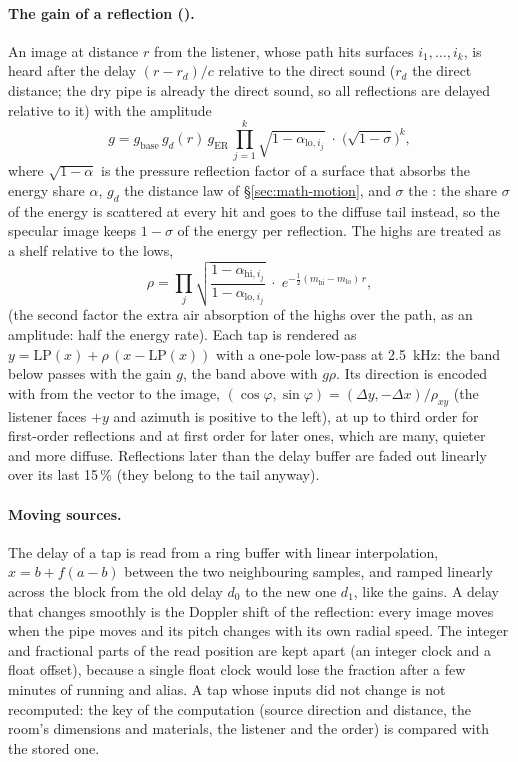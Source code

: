 \paragraph{The gain of a reflection ().} An image at distance $r$ from the listener, whose path hits
surfaces $i_1,\dots,i_k$, is heard after the delay $(r - r_d)/c$ relative to the direct sound ($r_d$ the direct distance;
the dry pipe is already the direct sound, so all reflections are delayed relative to it) with the amplitude
\begin{equation}
  g = g_\mathrm{base}\, g_d(r)\, g_\mathrm{ER}\,\prod_{j=1}^{k}\sqrt{1-\alpha_{\mathrm{lo},i_j}}\;\cdot\;\bigl(\sqrt{1-\sigma}\bigr)^{k},
\end{equation}
where $\sqrt{1-\alpha}$ is the pressure reflection factor of a surface that absorbs the energy share $\alpha$, $g_d$ the
distance law of \S\ref{sec:math-motion}, and $\sigma$ the : the share $\sigma$ of the energy is scattered at
every hit and goes to the diffuse tail instead, so the specular image keeps $1-\sigma$ of the energy per reflection. The
highs are treated as a shelf relative to the lows,
\begin{equation}
  \rho = \prod_j \sqrt{\frac{1-\alpha_{\mathrm{hi},i_j}}{1-\alpha_{\mathrm{lo},i_j}}}\;\cdot\;e^{-\frac12(m_\mathrm{hi}-m_\mathrm{lo})\,r},
\end{equation}
(the second factor the extra air absorption of the highs over the path, as an amplitude: half the energy rate). Each tap
is rendered as $y = \mathrm{LP}(x) + \rho\,(x - \mathrm{LP}(x))$ with a one-pole low-pass at \SI{2.5}{kHz}: the band
below passes with the gain $g$, the band above with $g\rho$. Its direction is encoded with  from the
vector to the image, $(\cos\varphi,\sin\varphi) = (\Delta y, -\Delta x)/\rho_{xy}$ (the listener faces $+y$ and
azimuth is positive to the left), at up to third order for first-order reflections and at first order for later ones,
which are many, quieter and more diffuse. Reflections later than the delay buffer are faded out linearly over its last
15\,\% (they belong to the tail anyway).

\paragraph{Moving sources.} The delay of a tap is read from a ring buffer with linear interpolation,
$x = b + f(a-b)$ between the two neighbouring samples, and ramped linearly across the block from the old delay $d_0$ to
the new one $d_1$, like the gains. A delay that changes smoothly is the Doppler shift of the reflection: every image
moves when the pipe moves and its pitch changes with its own radial speed. The integer and fractional parts of the
read position are kept apart (an integer clock and a float offset), because a single float clock would lose the
fraction after a few minutes of running and alias. A tap whose inputs did not change is not recomputed: the key of the
computation (source direction and distance, the room's dimensions and materials, the listener and the order) is
compared with the stored one.

